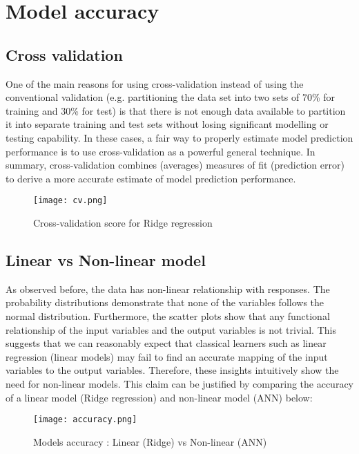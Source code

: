 \section{Model accuracy}

  \subsection{Cross validation}
    One of the main reasons for using cross-validation instead of using the conventional validation (e.g. partitioning the data set into two sets of 70\% for training and 30\% for test) is that there is not enough data available to partition it into separate training and test sets without losing significant modelling or testing capability. In these cases, a fair way to properly estimate model prediction performance is to use cross-validation as a powerful general technique. In summary, cross-validation combines (averages) measures of fit (prediction error) to derive a more accurate estimate of model prediction performance.
    \begin{figure}[htbp]
      \hspace*{-2cm}
      \texttt{[image: cv.png]}
      \caption{Cross-validation score for Ridge regression}
      \label{fig:cv}                    
    \end{figure}
\newpage
  \subsection{Linear vs Non-linear model}
  As observed before, the data has non-linear relationship with responses. The probability distributions demonstrate that none of the variables follows the normal distribution. Furthermore, the scatter plots show that any functional relationship of the input variables and the output variables is not trivial. This suggests that we can reasonably expect that classical learners such as linear regression (linear models) may fail to find an accurate mapping of the input variables to the output variables. Therefore, these insights intuitively show the need for non-linear models. This claim can be justified by comparing the accuracy of a linear model (Ridge regression) and non-linear model (ANN) below:
  \begin{figure}[h!]
      \centering
      \texttt{[image: accuracy.png]}
      \caption{Models accuracy : Linear (Ridge) vs Non-linear (ANN)}
      \label{fig:accuracy}                    
  \end{figure}


